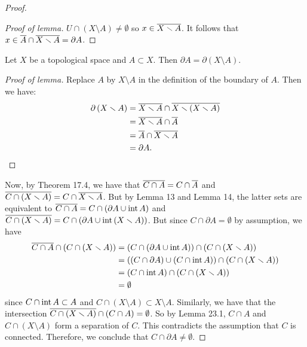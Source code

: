 \begin{proof}
\begin{proof}[Proof of lemma]
$U\cap (X\setminus A)\neq\emptyset$ so $x\in\overline{X\smallsetminus
  A}$. It follows that $x\in\overline{A}\cap\overline{X\smallsetminus
  A}=\partial A$.
\end{proof}
\begin{lemma}
Let $X$ be a topological space and $A\subset X$. Then $\partial
A=\partial\left(X\setminus A\right)$.
\end{lemma}
\begin{proof}[Proof of lemma]
\renewcommand\qedsymbol{$\clubsuit$}
Replace $A$ by $X\setminus A$ in the definition of the boundary
of $A$. Then we have:
\begin{align*}
\partial\left(X\smallsetminus A\right)&=\overline{X\smallsetminus A}\cap
                             \overline{X\smallsetminus\left(X\smallsetminus A\right)}\\
&=\overline{X\smallsetminus A}\cap\overline{A}\\
&=\overline{A}\cap\overline{X\smallsetminus A}\\
&=\partial A.
\end{align*}
\end{proof}
Now, by Theorem 17.4, we have that $\overline{C\cap A}=C\cap\overline{A}$
and $\overline{C\cap\left(X\smallsetminus A\right)}=C\cap\overline{X\smallsetminus
  A}$. But by Lemma 13 and Lemma 14, the latter sets are
equivalent to $\overline{C\cap A}=C\cap\left(\partial A\cup\operatorname{int}
  A\right)$ and $\overline{C\cap\left(X\smallsetminus
    A\right)}=C\cap\left(\partial A\cup\operatorname{int}\left(X\smallsetminus
    A\right)\right)$. But since $C\cap\partial A=\emptyset$ by
assumption, we have
\begin{align*}
\overline{C\cap A}\cap\left(C\cap\left(X\smallsetminus A\right)\right)
&=\left(C\cap\left(\partial A\cup\operatorname{int} A\right)\right)
\cap\left(C\cap\left(X\smallsetminus A\right)\right)\\
&=\left(\left(C\cap\partial A\right)
\cup
\left(C\cap\operatorname{int} A\right)\right)
\cap
\left(C\cap\left(X\smallsetminus A\right)\right)\\
&=\left(C\cap\operatorname{int} A\right)\cap\left(C\cap\left(X\smallsetminus A\right)\right)\\
&=\emptyset
\end{align*}
since $C\cap\operatorname{int} A\subset A$ and $C\cap\left(X\setminus
  A\right)\subset X\setminus A$. Similarly, we have that the intersection
$\overline{C\cap\left(X\smallsetminus A\right)}\cap\left(C\cap
  A\right)=\emptyset$. So by Lemma 23.1, $C\cap A$ and
$C\cap\left(X\setminus A\right)$ form a separation of $C$. This
contradicts the assumption that $C$ is connected. Therefore, we
conclude that $C\cap\partial A\neq\emptyset$.
\end{proof}
\newpage
